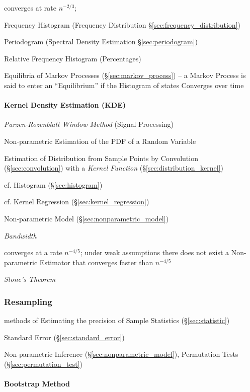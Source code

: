 converges at rate $n^{-2/3}$;

Frequency Histogram (Frequency Distribution \S\ref{sec:frequency_distribution})

\fist Periodogram (Spectral Density Estimation \S\ref{sec:periodogram})

Relative Frequency Histogram (Percentages)

Equilibria of Markov Processes (\S\ref{sec:markov_process}) -- a Markov Process
is said to enter an ``Equilibrium'' if the Histogram of states Converges over
time



\paragraph{Kernel Density Estimation (KDE)}\label{sec:kde}\hfill

\emph{Parzen-Rozenblatt Window Method} (Signal Processing)

Non-parametric Estimation of the PDF of a Random Variable

Estimation of Distribution from Sample Points by Convolution
(\S\ref{sec:convolution}) with a \emph{Kernel Function}
(\S\ref{sec:distribution_kernel})

cf. Histogram (\S\ref{sec:histogram})

cf. Kernel Regression (\S\ref{sec:kernel_regression})

Non-parametric Model (\S\ref{sec:nonparametric_model})

\emph{Bandwidth}

converges at a rate $n^{-4/5}$;
under weak assumptions there does not exist a Non-parametric Estimator that
converges faster than $n^{-4/5}$

\emph{Stone's Theorem}



\subsubsection{Resampling}\label{sec:resampling}

methods of Estimating the precision of Sample Statistics (\S\ref{sec:statistic})

\fist Standard Error (\S\ref{sec:standard_error})

Non-parametric Inference (\S\ref{sec:nonparametric_model}), Permutation Tests
(\S\ref{sec:permutation_test})



\paragraph{Bootstrap Method}\label{sec:bootstrap_method}\hfill

